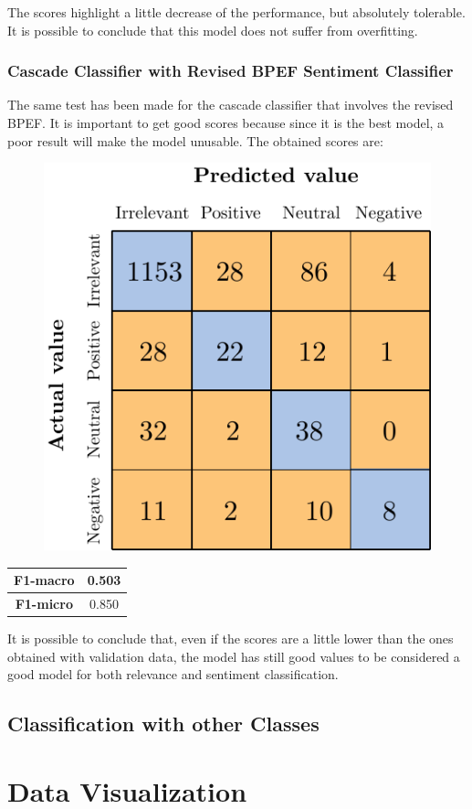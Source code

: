The scores highlight a little decrease of the performance, but absolutely tolerable. It is possible to conclude that this model does not suffer from overfitting.


\subsubsection{Cascade Classifier with Revised BPEF Sentiment Classifier}

The same test has been made for the cascade classifier that involves the revised BPEF. It is important to get good scores because since it is the best model, a poor result will make the model unusable. The obtained scores are:

\begin{figure}[H]
	\centering
	\includegraphics[scale=1]{figures/conf_matrices/ita_cascade_bpef/ita_cascade_bpef_tst.pdf}
	\label{fig:ita_cascade_bpef_tst}
\end{figure}

\begin{center}
	\begin{tabular}{ | c | c | } 
		\hline
		\textbf{F1-macro} & 0.503 \\
		\hline
		\textbf{F1-micro} & 0.850 \\ 
		\hline
	\end{tabular}
\end{center}

It is possible to conclude that, even if the scores are a little lower than the ones obtained with validation data, the model has still good values to be considered a good model for both relevance and sentiment classification.


\subsection{Classification with other Classes}


\section{Data Visualization}
